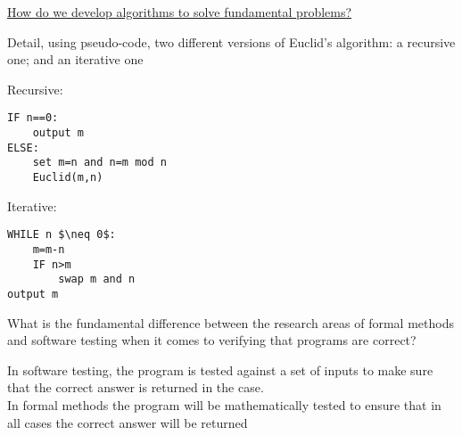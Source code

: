 \documentclass[addpoints]{exam}
\begin{document}
\begin{center}
	\underline{\LARGE How do we develop algorithms to solve fundamental problems?}
\end{center}
\begin{questions}
	\question[6]Detail, using pseudo-code, two different versions of Euclid's algorithm: a recursive one; and an iterative one
	\begin{solution}[2in]
		Recursive:\\
		\begin{lstlisting}
IF n==0:
	output m
ELSE:
	set m=n and n=m mod n
	Euclid(m,n)
		\end{lstlisting}
		Iterative:
		\begin{lstlisting}
WHILE n $\neq 0$:
	m=m-n
	IF n>m
		swap m and n
output m
		\end{lstlisting}
	\end{solution}


\question[4]What is the fundamental difference between the research areas of formal methods and software testing when it comes to verifying that programs are correct?
\begin{solution}[2in]
	In software testing, the program is tested against a set of inputs to make sure that the correct answer is returned in the case.\\
	In formal methods the program will be mathematically tested to ensure that in all cases the correct answer will be returned\\
\end{solution}


\end{questions}
\end{document}
